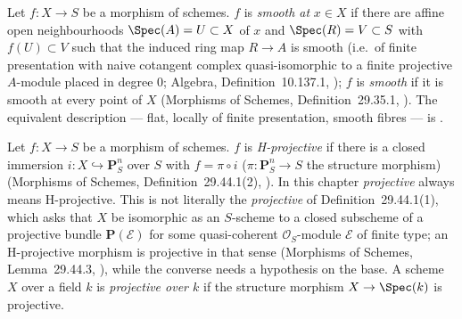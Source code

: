 \begin{definition}\label{def:pc-smooth-morphism}
Let $f:X\to S$ be a morphism of schemes.  $f$ is \emph{smooth at}
$x\in X$ if there are affine open neighbourhoods $\Spec(A)=U\subset X$
of $x$ and $\Spec(R)=V\subset S$ with $f(U)\subset V$ such that the
induced ring map $R\to A$ is smooth (i.e.\ of finite presentation with
naive cotangent complex quasi-isomorphic to a finite projective
$A$-module placed in degree $0$; Algebra, Definition~10.137.1,
); $f$ is
\emph{smooth} if it is smooth at every point of $X$ (Morphisms of
Schemes, Definition~29.35.1,
).  The equivalent
description --- flat, locally of finite presentation, smooth fibres ---
is .
\mathlibok\ 
\end{definition}

\begin{definition}\label{def:pc-projective-morphism}
Let $f:X\to S$ be a morphism of schemes.  $f$ is \emph{H-projective}
if there is a closed immersion
$i:X\hookrightarrow\mathbf P^n_S$ over $S$ with $f=\pi\circ i$
($\pi:\mathbf P^n_S\to S$ the structure morphism) (Morphisms of
Schemes, Definition~29.44.1(2),
).  In this chapter \emph{projective} always means
H-projective.  This is not literally the \emph{projective} of
Definition~29.44.1(1), which asks that $X$ be isomorphic as an
$S$-scheme to a closed subscheme of a projective bundle
$\mathbf P(\mathcal E)$ for some quasi-coherent $\mathcal O_S$-module
$\mathcal E$ of finite type; an H-projective morphism is projective in
that sense (Morphisms of Schemes, Lemma~29.44.3,
), while the converse needs a hypothesis on the
base.  A scheme $X$
over a field $k$ is \emph{projective over $k$} if the structure morphism
$X\to\Spec(k)$ is projective.
\leanok
{}
\end{definition}

